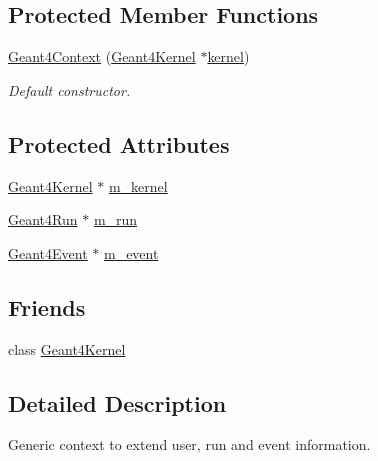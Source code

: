 \subsection*{Protected Member Functions}
\begin{DoxyCompactItemize}
\item 
\hyperlink{class_d_d4hep_1_1_simulation_1_1_geant4_context_a95592e635ace3345c980cb855cd370a6}{Geant4\+Context} (\hyperlink{class_d_d4hep_1_1_simulation_1_1_geant4_kernel}{Geant4\+Kernel} $\ast$\hyperlink{class_d_d4hep_1_1_simulation_1_1_geant4_context_a4374827bf9949372b0e79fb952b186d7}{kernel})
\begin{DoxyCompactList}\small\item\em Default constructor. \end{DoxyCompactList}\end{DoxyCompactItemize}
\subsection*{Protected Attributes}
\begin{DoxyCompactItemize}
\item 
\hyperlink{class_d_d4hep_1_1_simulation_1_1_geant4_kernel}{Geant4\+Kernel} $\ast$ \hyperlink{class_d_d4hep_1_1_simulation_1_1_geant4_context_a039b270efa705522ec33989d69518c49}{m\+\_\+kernel}
\item 
\hyperlink{class_d_d4hep_1_1_simulation_1_1_geant4_run}{Geant4\+Run} $\ast$ \hyperlink{class_d_d4hep_1_1_simulation_1_1_geant4_context_a87c4aed90cd013934b16b5307b65184c}{m\+\_\+run}
\item 
\hyperlink{class_d_d4hep_1_1_simulation_1_1_geant4_event}{Geant4\+Event} $\ast$ \hyperlink{class_d_d4hep_1_1_simulation_1_1_geant4_context_a3aba509b9246b6e8b8c89a9bf61b9a4c}{m\+\_\+event}
\end{DoxyCompactItemize}
\subsection*{Friends}
\begin{DoxyCompactItemize}
\item 
class \hyperlink{class_d_d4hep_1_1_simulation_1_1_geant4_context_ade874a98c0c1bcb1b8c2d456037b3f5a}{Geant4\+Kernel}
\end{DoxyCompactItemize}


\subsection{Detailed Description}
Generic context to extend user, run and event information. 

